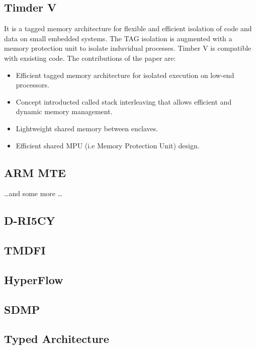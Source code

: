 \subsection{Timder V}
 It is a tagged memory architecture for flexible and efficient isolation of code and data on 
 small embedded systems. The TAG isolation is augmented with a memory protection unit to isolate 
 induvidual processes. Timber V is compatible with exsisting code. The contributions of the paper 
 are: 
 \begin{itemize}
  \item Efficient tagged memory architecture for isolated execution on low-end processors. 
  \item Concept introducted called stack interleaving that allows efficient and dynamic memory management. 
  \item Lightweight shared memory between enclaves. 
  \item Efficient shared MPU (i.e Memory Protection Unit) design. 
 \end{itemize}
 

	
\subsection{ARM MTE}
\dots and some more \dots 

\subsection{D-RI5CY}

\subsection{TMDFI}

\subsection{HyperFlow} 

\subsection{SDMP}

\subsection{Typed Architecture}

